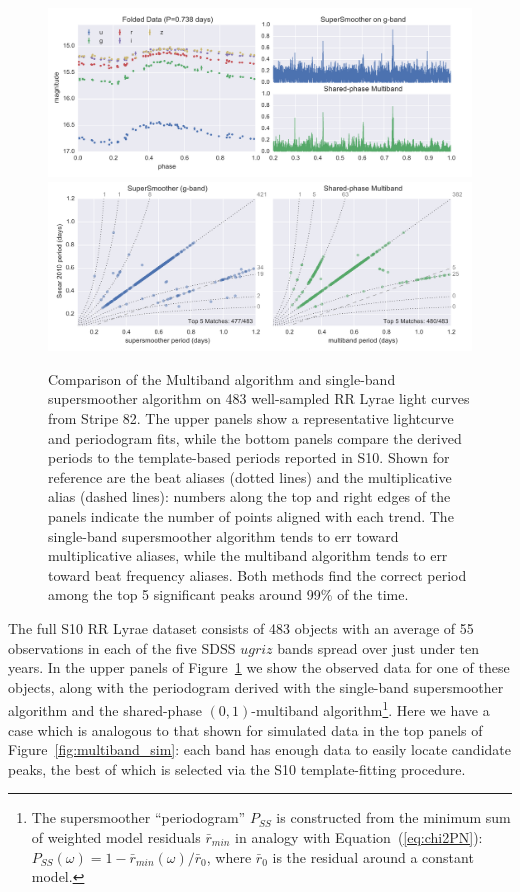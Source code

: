\documentclass[12pt,preprint]{aastex}
\newcommand{\Fig}[1]{Figure~\ref{fig:#1}}
\newcommand{\fig}[1]{\Fig{#1}}
\newcommand{\figlabel}[1]{\label{fig:#1}}
\newcommand{\Eq}[1]{Equation~(\ref{eq:#1})}
\newcommand{\eq}[1]{\Eq{#1}}
\begin{document}
\begin{figure}
  \centering
  \includegraphics[width=\textwidth]{fig07a.pdf}
  \includegraphics[width=\textwidth]{fig07b.pdf}
  \caption{
    Comparison of the Multiband algorithm and single-band supersmoother algorithm on 483 well-sampled RR Lyrae light curves from Stripe 82.
    The upper panels show a representative lightcurve and periodogram fits, while the bottom panels compare the derived periods to the template-based periods reported in S10.
    Shown for reference are the beat aliases (dotted lines) and the multiplicative alias (dashed lines): numbers along the top and right edges of the panels indicate the number of points aligned with each trend.
    The single-band supersmoother algorithm tends to err toward multiplicative aliases, while the multiband algorithm tends to err toward beat frequency aliases.
    Both methods find the correct period among the top 5 significant peaks around 99\% of the time.
  } 
  \figlabel{compare_periods}
\end{figure}

The full S10 RR Lyrae dataset consists of 483 objects with an average of 55 observations in each of the five SDSS $ugriz$ bands spread over just under ten years.  In the upper panels of \fig{compare_periods} we show the observed data for one of these objects, along with the periodogram derived with the single-band supersmoother algorithm and the shared-phase $(0, 1)$-multiband algorithm\footnote{The supersmoother ``periodogram'' $P_{SS}$ is constructed from the minimum sum of weighted model residuals $\bar{r}_{min}$ in analogy with \eq{chi2PN}: $P_{SS}(\omega) = 1 - \bar{r}_{min}(\omega) / \bar{r}_0$, where $\bar{r}_0$ is the residual around a constant model.}. Here we have a case which is analogous to that shown for simulated data in the top panels of \fig{multiband_sim}: each band has enough data to easily locate candidate peaks, the best of which is selected via the S10 template-fitting procedure.
\end{document}
